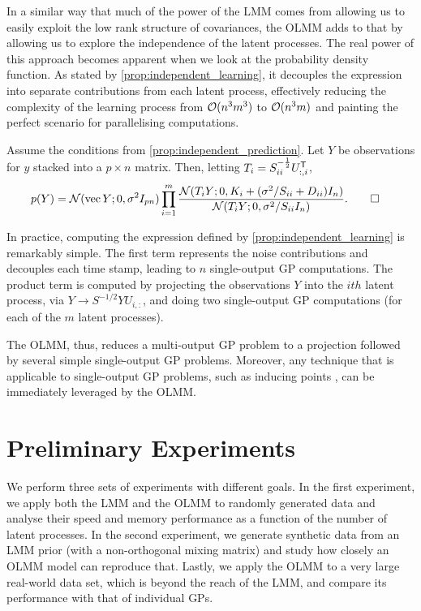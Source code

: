 \documentclass{article}
\begin{document}
In a similar way that much of the power of the LMM comes from allowing us to easily exploit the low rank structure of covariances, the OLMM adds to that by allowing us to explore the independence of the latent processes. 
The real power of this approach becomes apparent when we look at the probability density function. As stated by \cref{prop:independent_learning}, it decouples the expression into separate contributions from each latent process, effectively reducing the complexity of the learning process from $\mathcal{O}(n^3m^3)$ to $\mathcal{O}(n^3m)$ and painting the perfect scenario for parallelising computations.

\begin{proposition} \label{prop:independent_learning}
    Assume the conditions from \cref{prop:independent_prediction}.
    Let $Y$ be observations for $y$ stacked into a $p \times n$ matrix.
    Then, letting $T_i = S_{ii}^{-\frac{1}{2}}U_{:,i}^{\text{\textsf{T}}}$,
    \begin{align*}
        p(Y)
        &= \mathcal{N}(\operatorname{vec} Y;0,\sigma^2 I_{pn}) \prod_{i=1}^m
        \frac
            {\mathcal{N}(T_i Y ; 0, K_i + (\sigma^2/S_{ii} + D_{ii}) I_n)}
            {\mathcal{N}(T_i Y ;0, \sigma^2/S_{ii}I_n)}. \qedhere
    \end{align*}
\end{proposition}

In practice, computing the expression defined by \cref{prop:independent_learning} is remarkably simple. 
The first term represents the noise contributions and decouples each time stamp, leading to $n$ single-output GP computations. The product term is computed by projecting the observations $Y$ into the $ith$ latent process, via $Y \xrightarrow{} S^{-1/2}YU_{i,:}$, and doing two single-output GP computations (for each of the $m$ latent processes).

The OLMM, thus, reduces a multi-output GP problem to a projection followed by several simple single-output GP problems. 
Moreover, any technique that is applicable to single-output GP problems, such as inducing points \cite{Titsias:2009:Variational_Learning, Bui:2016:A_Unifying_Framework_for_Gaussian}, can be immediately leveraged by the OLMM. 

\section{Preliminary Experiments}
\label{sec:experiments}

We perform three sets of experiments with different goals. 
In the first experiment, we apply both the LMM and the OLMM to randomly generated data and analyse their speed and memory performance as a function of the number of latent processes. 
In the second experiment, we generate synthetic data from an LMM prior (with a non-orthogonal mixing matrix) and study how closely an OLMM model can reproduce that. 
Lastly, we apply the OLMM to a very large real-world data set, which is beyond the reach of the LMM, and compare its performance with that of individual GPs.
\end{document}
